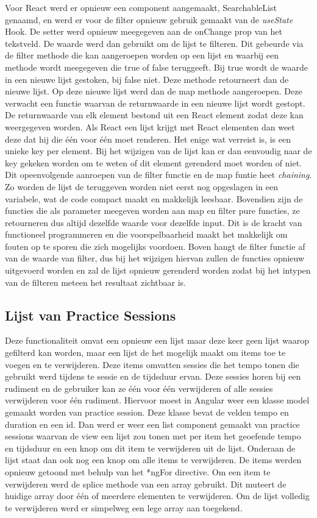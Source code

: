  Voor React werd er opnieuw een component aangemaakt, SearchableList genaamd, en werd er voor de filter opnieuw gebruik gemaakt van de \textit{useState} Hook. De setter werd opnieuw meegegeven aan de onChange prop van het tekstveld. De waarde werd dan gebruikt om de lijst te filteren. Dit gebeurde via de filter methode die kan aangeroepen worden op een lijst en waarbij een methode wordt meegegeven die true of false teruggeeft. Bij true wordt de waarde in een nieuwe lijst gestoken, bij false niet. Deze methode retourneert dan de nieuwe lijst. Op deze nieuwe lijst werd dan de map methode aangeroepen. Deze verwacht een functie waarvan de returnwaarde in een nieuwe lijst wordt gestopt. De returnwaarde van elk element bestond uit een React element zodat deze kan weergegeven worden. Als React een lijst krijgt met React elementen dan weet deze dat hij die één voor één moet renderen. Het enige wat verreist is, is een unieke key per element. Bij het wijzigen van de lijst kan er dan eenvoudig naar de key gekeken worden om te weten of dit element gerenderd moet worden of niet. Dit opeenvolgende aanroepen van de filter functie en de map funtie heet \textit{chaining}. Zo worden de lijst de teruggeven worden niet eerst nog opgeslagen in een variabele, wat de code compact maakt en makkelijk leesbaar. Bovendien zijn de functies die als parameter meegeven worden aan map en filter pure functies, ze retourneren dus altijd dezelfde waarde voor dezelfde input. Dit is de kracht van functioneel programmeren en die voorspelbaarheid maakt het makkelijk om fouten op te sporen die zich mogelijks voordoen. Boven hangt de filter functie af van de waarde van filter, dus bij het wijzigen hiervan zullen de functies opnieuw uitgevoerd worden en zal de lijst opnieuw gerenderd worden zodat bij het intypen van de filteren meteen het resultaat zichtbaar is.

 \subsection{Lijst van Practice Sessions}
 Deze functionaliteit omvat een opnieuw een lijst maar deze keer geen lijst waarop gefilterd kan worden, maar een lijst de het mogelijk maakt om items toe te voegen en te verwijderen. Deze items omvatten sessies die het tempo tonen die gebruikt werd tijdens te sessie en de tijdsduur ervan. Deze sessies horen bij een rudiment en de gebruiker kan ze één voor één verwijderen of alle sessies verwijderen voor één rudiment. Hiervoor moest in Angular weer een klasse model gemaakt worden van practice session. Deze klasse bevat de velden tempo en duration en een id. Dan werd er weer een list component gemaakt van practice sessions waarvan de view een lijst zou tonen met per item het geoefende tempo en tijdsduur en een knop om dit item te verwijderen uit de lijst. Onderaan de lijst staat dan ook nog een knop om alle items te verwijderen. De items werden opnieuw getoond met behulp van het *ngFor directive. Om een item te verwijderen werd de splice methode van een array gebruikt. Dit muteert de huidige array door één of meerdere elementen te verwijderen. Om de lijst volledig te verwijderen werd er simpelweg een lege array aan toegekend.

